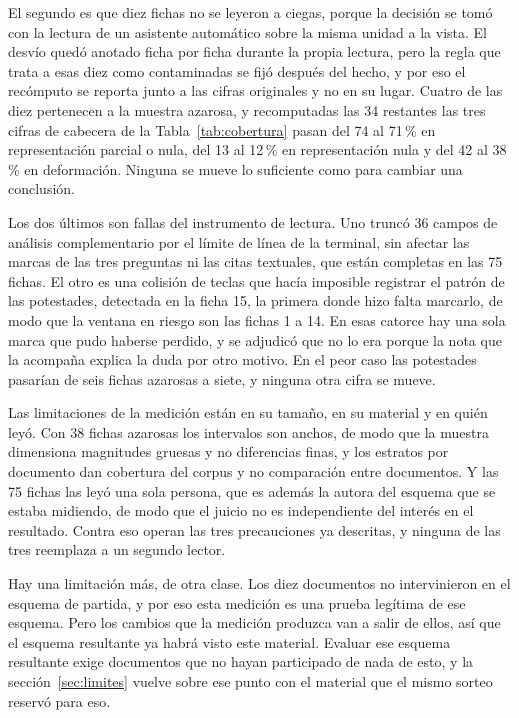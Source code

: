 \documentclass[12pt,a4paper]{report}
\begin{document}
El segundo es que diez fichas no se leyeron a ciegas, porque la decisión se tomó con la lectura de un asistente automático sobre la misma unidad a la vista. El desvío quedó anotado ficha por ficha durante la propia lectura, pero la regla que trata a esas diez como contaminadas se fijó después del hecho, y por eso el recómputo se reporta junto a las cifras originales y no en su lugar. Cuatro de las diez pertenecen a la muestra azarosa, y recomputadas las 34 restantes las tres cifras de cabecera de la Tabla~\ref{tab:cobertura} pasan del 74 al 71\,\% en representación parcial o nula, del 13 al 12\,\% en representación nula y del 42 al 38\,\% en deformación. Ninguna se mueve lo suficiente como para cambiar una conclusión.

Los dos últimos son fallas del instrumento de lectura. Uno truncó 36 campos de análisis complementario por el límite de línea de la terminal, sin afectar las marcas de las tres preguntas ni las citas textuales, que están completas en las 75 fichas. El otro es una colisión de teclas que hacía imposible registrar el patrón de las potestades, detectada en la ficha 15, la primera donde hizo falta marcarlo, de modo que la ventana en riesgo son las fichas 1 a 14. En esas catorce hay una sola marca que pudo haberse perdido, y se adjudicó que no lo era porque la nota que la acompaña explica la duda por otro motivo. En el peor caso las potestades pasarían de seis fichas azarosas a siete, y ninguna otra cifra se mueve.

Las limitaciones de la medición están en su tamaño, en su material y en quién leyó. Con 38 fichas azarosas los intervalos son anchos, de modo que la muestra dimensiona magnitudes gruesas y no diferencias finas, y los estratos por documento dan cobertura del corpus y no comparación entre documentos. Y las 75 fichas las leyó una sola persona, que es además la autora del esquema que se estaba midiendo, de modo que el juicio no es independiente del interés en el resultado. Contra eso operan las tres precauciones ya descritas, y ninguna de las tres reemplaza a un segundo lector.

Hay una limitación más, de otra clase. Los diez documentos no intervinieron en el esquema de partida, y por eso esta medición es una prueba legítima de ese esquema. Pero los cambios que la medición produzca van a salir de ellos, así que el esquema resultante ya habrá visto este material. Evaluar ese esquema resultante exige documentos que no hayan participado de nada de esto, y la sección~\ref{sec:limites} vuelve sobre ese punto con el material que el mismo sorteo reservó para eso.
\end{document}
